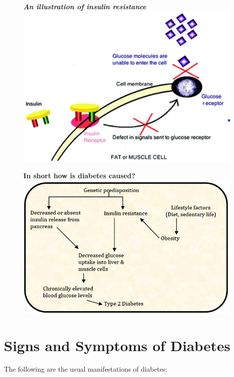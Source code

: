 \begin{figure}[h]
\centering
\textbf{\textit{An illustration of insulin resistance}}
\includegraphics[scale=2.5]{images/021.jpg}
\end{figure}

\clearpage

\textbf{}
\begin{figure}[h]
\centering
\textbf{In short how is diabetes caused?}\\
\includegraphics[scale=2.6]{images/022.jpg}
\end{figure}


\chapter{Signs and Symptoms of Diabetes}\label{chap4}

The following are the usual manifestations of diabetes:

